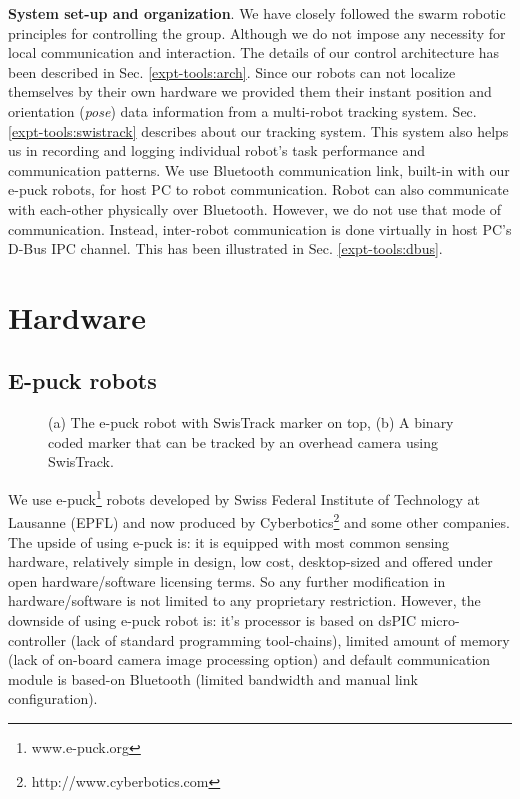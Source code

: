 \textbf{System set-up and organization}. We have closely followed the swarm robotic principles for controlling the group. Although we do not impose any necessity for local communication and interaction. The details of our control architecture has been described in Sec. \ref{expt-tools:arch}. Since our robots can not localize themselves by their own hardware we provided them their instant position and orientation ({\em pose}) data information from a multi-robot tracking system. Sec. \ref{expt-tools:swistrack} describes about our tracking system. This system also helps us in recording and logging individual robot's task performance and communication patterns. We use Bluetooth communication link, built-in with our e-puck robots, for host PC to robot communication. Robot can also communicate with each-other physically over Bluetooth. However, we do not use that mode of communication. Instead, inter-robot communication is done virtually in host PC's D-Bus IPC channel. This has been illustrated in Sec. \ref{expt-tools:dbus}.
\section{Hardware}
\subsection{E-puck robots}
\begin{figure}[htp]
\centering
{} 
\hspace{0.5cm}
\caption{(a) The e-puck robot with SwisTrack marker on top, (b) A binary coded marker that can be tracked by an overhead camera  using SwisTrack.}
\label{fig:e-puck}
\end{figure}
We use e-puck\footnote{www.e-puck.org} robots developed by Swiss Federal Institute of Technology at Lausanne (EPFL) and now produced by Cyberbotics\footnote{http://www.cyberbotics.com} and some other companies. The upside of using e-puck is: it is equipped with most common sensing hardware, relatively simple in design, low cost, desktop-sized and offered under open hardware/software licensing terms. So any further modification in hardware/software is not limited to any proprietary restriction. However, the downside of using e-puck robot is: it's processor is based on dsPIC micro-controller (lack of standard programming tool-chains), limited amount of memory (lack of on-board camera image processing option) and default communication module is based-on Bluetooth (limited bandwidth and manual link configuration).

